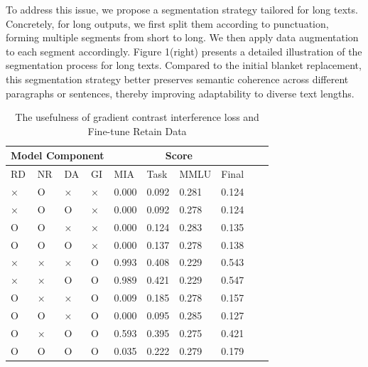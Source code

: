 \documentclass[11pt]{article}
\begin{document}
To address this issue, we propose a segmentation strategy tailored for long texts. 
Concretely, for long outputs, we first split them according to punctuation, forming multiple segments from short to long. 
We then apply data augmentation to each segment accordingly. 
Figure 1(right) presents a detailed illustration of the segmentation process for long texts. 
Compared to the initial blanket replacement, this segmentation strategy better preserves semantic coherence across different paragraphs or sentences, thereby improving adaptability to diverse text lengths.




\begin{table}[!t]
  \centering
    \begin{tabular}{llll|llllll}
    \hline
    \multicolumn{4}{c}{\textbf{Model Component}} & \multicolumn{4}{c}{\textbf{Score}} \\ \hline
         RD & NR & DA & GI & MIA & Task & MMLU & Final \\ \hline
         × & O & × & × & 0.000 & 0.092 & 0.281 & 0.124 \\ \hline
         × & O & O & × & 0.000 & 0.092 & 0.278 & 0.124 \\ \hline
         O & O & × & × & 0.000 & 0.124 & 0.283 & 0.135 \\ \hline
         O & O & O & × & 0.000 & 0.137 & 0.278 & 0.138 \\ \hline
         × & × & × & O & 0.993 & 0.408 & 0.229 & 0.543 \\ \hline
         × & × & O & O & 0.989 & 0.421 & 0.229 & 0.547 \\ \hline
         O & × & × & O & 0.009 & 0.185 & 0.278 & 0.157 \\ \hline
         O & O & × & O & 0.000 & 0.095 & 0.285 & 0.127 \\ \hline
         O & × & O & O & 0.593 & 0.395 & 0.275 & 0.421 \\ \hline
         O & O & O & O & 0.035 & 0.222 & 0.279 & 0.179 \\ \hline
    \end{tabular}
  \caption{
    The usefulness of gradient contrast interference loss and Fine-tune Retain Data
  }
  \label{tab:AS2}
\end{table}
\end{document}
